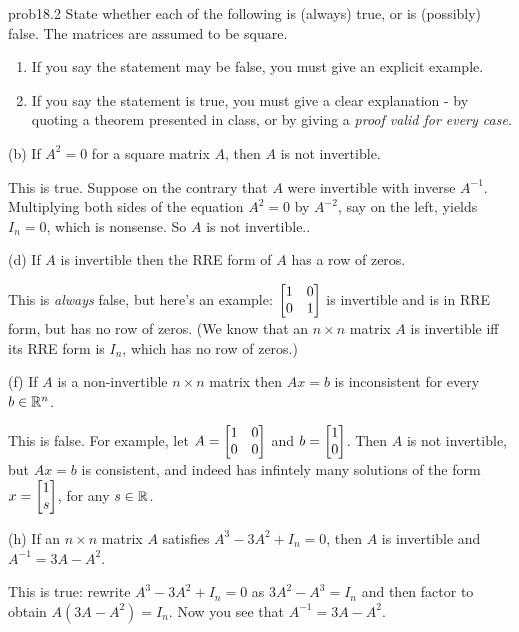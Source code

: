 \begin{sol}{prob18.2} State whether each of the following is (always) true,
or is (possibly) false.   The matrices are assumed to be square.   
   \smallskip    
\begin{enumerate}[$\bullet$]
\item If you say the statement may be false, you    must give an explicit example.   
\item If you say the statement is true, you must give a clear explanation -   by quoting a theorem presented in class, or by giving a {\it proof valid for every  case}. 
\end{enumerate}



(b)  If $A^2=0$ for a square matrix $A$, then $A$ is not invertible.

\soln This is true. Suppose on the contrary that $A$ were invertible with inverse $A^{-1}$. Multiplying both sides of the equation $A^2=0$ by $A^{-2}$, say on the left, yields $I_n=0$, which is nonsense. So $A$ is not invertible..
\medskip
%

(d) If $A$ is invertible then the RRE form of $A$ has a row of zeros.

\soln This is {\it always} false, but here's an example: $\bmatrix 1&0\\0&1\endbmatrix$ is invertible and is in RRE form, but has no row of zeros. (We know that an $n \times n$ matrix $A$ is invertible iff its RRE form is $I_n$, which has no row of zeros.)
\medskip
%


(f) If $ A $ is a non-invertible $ n\times n$  matrix then $Ax=b$ is inconsistent for every $b \in \mathbb{R}^n$.

\soln This is false. For example,  let $A=\bmatrix 1&0\\0&0
\endbmatrix$ and $b=\bmatrix 1\\0
\endbmatrix$. Then $A$ is not invertible, but $Ax=b$ is consistent, and indeed has infintely many solutions of the form $x=\bmatrix 1\\s
\endbmatrix$, for any $s\in \mathbb{R}$.
\medskip
%

(h) If an $ n\times n$  matrix $A$ satisfies $A^{3}-3A^{2}+I_{n}=0$, then $A$ is invertible and  $A^{-1}=3A-A^{2}$. 

\soln This is true: rewrite $A^{3}-3A^{2}+I_{n}=0$ as $3A^{2}-A^3=I_{n}$ and then factor to obtain $A(3A-A^2)=I_{n}$.  Now you see that $A^{-1}=3A-A^{2}$.
\medskip

\end{sol}

